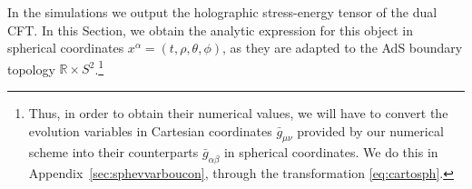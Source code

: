 \documentclass[a4paper,11pt]{article}
\numberwithin{equation}{section}
\begin{document}

In the simulations we output the holographic stress-energy tensor of the dual CFT.
In this Section, we obtain the analytic expression for this object in spherical coordinates $x^\alpha=(t,\rho,\theta,\phi)$, as they are adapted to the AdS boundary topology $\mathbb{R}\times S^2$.\footnote{Thus, in order to obtain their numerical values, we will have to convert the evolution variables in Cartesian coordinates $\bar{g}_{\mu\nu}$ provided by our numerical scheme into their counterparts $\bar{g}_{\alpha\beta}$ in spherical coordinates. We do this in Appendix~\ref{sec:sphevvarboucon}, through the transformation \eqref{eq:cartosph}.}

\end{document}
